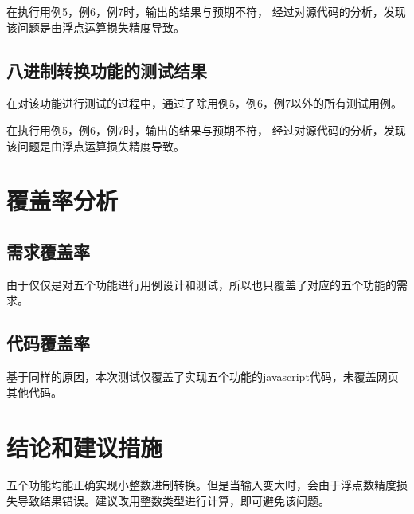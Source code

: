 \documentclass[12pt, a4paper, oneside]{ctexart}
\begin{document}
在执行用例5，例6，例7时，输出的结果与预期不符，
经过对源代码的分析，发现该问题是由浮点运算损失精度导致。

\subsection{八进制转换功能的测试结果}
在对该功能进行测试的过程中，通过了除用例5，例6，例7以外的所有测试用例。

在执行用例5，例6，例7时，输出的结果与预期不符，
经过对源代码的分析，发现该问题是由浮点运算损失精度导致。

\section{覆盖率分析}
\subsection{需求覆盖率}
由于仅仅是对五个功能进行用例设计和测试，所以也只覆盖了对应的五个功能的需求。

\subsection{代码覆盖率}
基于同样的原因，本次测试仅覆盖了实现五个功能的javascript代码，未覆盖网页其他代码。

\section{结论和建议措施}
五个功能均能正确实现小整数进制转换。但是当输入变大时，会由于浮点数精度损失导致结果错误。建议改用整数类型进行计算，即可避免该问题。
\end{document}
